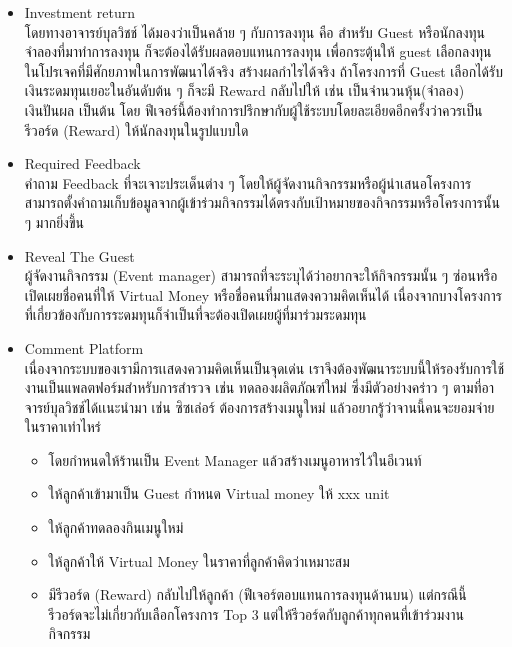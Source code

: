 \begin{itemize}
      \item Investment return \\
            โดยทางอาจารย์บุลวิชช์ ได้มองว่าเป็นคล้าย ๆ กับการลงทุน คือ สำหรับ Guest หรือนักลงทุนจำลองที่มาทำการลงทุน ก็จะต้องได้รับผลตอบแทนการลงทุน เพื่อกระตุ้นให้ guest เลือกลงทุนในโปรเจคที่มีศักยภาพในการพัฒนาได้จริง สร้างผลกำไรได้จริง ถ้าโครงการที่ Guest เลือกได้รับเงินระดมทุนเยอะในอันดับต้น ๆ ก็จะมี Reward กลับไปให้ เช่น เป็นจำนวนหุ้น(จำลอง) เงินปันผล เป็นต้น
            โดย ฟีเจอร์นี้ต้องทำการปรึกษากับผู้ใช้ระบบโดยละเอียดอีกครั้งว่าควรเป็นรีวอร์ด (Reward) ให้นักลงทุนในรูปแบบใด
      \item Required Feedback \\
            คำถาม Feedback ที่จะเจาะประเด็นต่าง ๆ โดยให้ผู้จัดงานกิจกรรมหรือผู้นำเสนอโครงการสามารถตั้งคำถามเก็บข้อมูลจากผู้เข้าร่วมกิจกรรมได้ตรงกับเป้าหมายของกิจกรรมหรือโครงการนั้น ๆ มากยิ่งขึ้น
      \item Reveal The Guest \\
            ผู้จัดงานกิจกรรม (Event manager) สามารถที่จะระบุได้ว่าอยากจะให้กิจกรรมนั้น ๆ ซ่อนหรือเปิดเผยชื่อคนที่ให้ Virtual Money หรือชื่อคนที่มาแสดงความคิดเห็นได้ เนื่องจากบางโครงการที่เกี่ยวข้องกับการระดมทุนก็จำเป็นที่จะต้องเปิดเผยผู้ที่มาร่วมระดมทุน
      \item Comment Platform \\
            เนื่องจากระบบของเรามีการเเสดงความคิดเห็นเป็นจุดเด่น เราจึงต้องพัฒนาระบบนี้ให้รองรับการใช้งานเป็นแพลตฟอร์มสำหรับการสำรวจ เช่น ทดลองผลิตภัณฑ์ใหม่
            ซึ่งมีตัวอย่างคร่าว ๆ ตามที่อาจารย์บุลวิชช์ได้เเนะนำมา เช่น ซิซเล่อร์ ต้องการสร้างเมนูใหม่ แล้วอยากรู้ว่าจานนี้คนจะยอมจ่ายในราคาเท่าไหร่
            \begin{itemize}
                  \item โดยกำหนดให้ร้านเป็น Event Manager แล้วสร้างเมนูอาหารไว้ในอีเวนท์

                  \item ให้ลูกค้าเข้ามาเป็น Guest กำหนด Virtual money ให้ xxx unit

                  \item ให้ลูกค้าทดลองกินเมนูใหม่

                  \item ให้ลูกค้าให้ Virtual Money ในราคาที่ลูกค้าคิดว่าเหมาะสม

                  \item มีรีวอร์ด (Reward) กลับไปให้ลูกค้า (ฟีเจอร์ตอบแทนการลงทุนด้านบน) แต่กรณีนี้ รีวอร์ดจะไม่เกี่ยวกับเลือกโครงการ Top 3 แต่ให้รีวอร์ดกับลูกค้าทุกคนที่เข้าร่วมงานกิจกรรม
            \end{itemize}
\end{itemize}